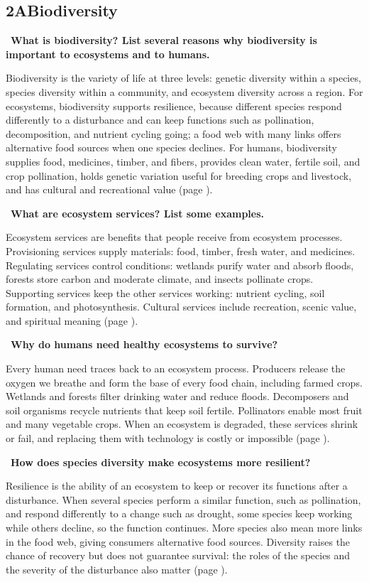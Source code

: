 \documentclass[11pt,letterpaper]{article}
\newcommand{\sq}[1]{\par\Needspace{6\baselineskip}\medskip{\color{forest}\textbf{Q.}}\ \textbf{#1}\par\smallskip}
\newcommand{\ans}[1]{#1\par}
\begin{document}
\subsection*{2A\quad Biodiversity}
\sq{What is biodiversity? List several reasons why biodiversity is important to ecosystems and to humans.}
\ans{Biodiversity is the variety of life at three levels: genetic diversity within a species, species diversity within a community, and ecosystem diversity across a region. For ecosystems, biodiversity supports resilience, because different species respond differently to a disturbance and can keep functions such as pollination, decomposition, and nutrient cycling going; a food web with many links offers alternative food sources when one species declines. For humans, biodiversity supplies food, medicines, timber, and fibers, provides clean water, fertile soil, and crop pollination, holds genetic variation useful for breeding crops and livestock, and has cultural and recreational value (page \pageref{twoa}).}
\sq{What are ecosystem services? List some examples.}
\ans{Ecosystem services are benefits that people receive from ecosystem processes. Provisioning services supply materials: food, timber, fresh water, and medicines. Regulating services control conditions: wetlands purify water and absorb floods, forests store carbon and moderate climate, and insects pollinate crops. Supporting services keep the other services working: nutrient cycling, soil formation, and photosynthesis. Cultural services include recreation, scenic value, and spiritual meaning (page \pageref{twoa}).}
\sq{Why do humans need healthy ecosystems to survive?}
\ans{Every human need traces back to an ecosystem process. Producers release the oxygen we breathe and form the base of every food chain, including farmed crops. Wetlands and forests filter drinking water and reduce floods. Decomposers and soil organisms recycle nutrients that keep soil fertile. Pollinators enable most fruit and many vegetable crops. When an ecosystem is degraded, these services shrink or fail, and replacing them with technology is costly or impossible (page \pageref{twoa}).}
\sq{How does species diversity make ecosystems more resilient?}
\ans{Resilience is the ability of an ecosystem to keep or recover its functions after a disturbance. When several species perform a similar function, such as pollination, and respond differently to a change such as drought, some species keep working while others decline, so the function continues. More species also mean more links in the food web, giving consumers alternative food sources. Diversity raises the chance of recovery but does not guarantee survival: the roles of the species and the severity of the disturbance also matter (page \pageref{diversity}).}
\end{document}
